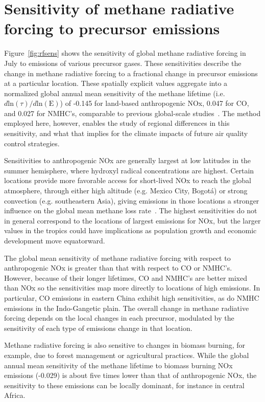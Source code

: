 \section{Sensitivity of methane radiative forcing to precursor emissions}

Figure~\ref{fig:rfsens} shows the sensitivity of global methane radiative forcing in July to emissions of various precursor gases. These sensitivities describe the change in methane radiative forcing to a fractional change in precursor emissions at a particular location. These spatially explicit values aggregate into a normalized global annual mean sensitivity of the methane lifetime (i.e. $d \mathrm{ln}(\tau)/d\mathrm{ln}(\mathrm{E})$) of -0.145 for land-based anthropogenic NOx, 0.047 for CO, and 0.027 for NMHC's, comparable to previous global-scale studies~\citep{ref:fry2012,ref:holmes2013}. The method employed here, however, enables the study of regional differences in this sensitivity, and what that implies for the climate impacts of future air quality control strategies.


Sensitivities to anthropogenic NOx are generally largest at low latitudes in the summer hemisphere, where hydroxyl radical concentrations are highest. Certain locations provide more favorable access for short-lived NOx to reach the global atmosphere, through either high altitude (e.g. Mexico City, Bogot\'a) or strong convection (e.g. southeastern Asia), giving emissions in those locations a stronger influence on the global mean methane loss rate~\citep{ref:bowman2012}. The highest sensitivities do not in general correspond to the locations of largest emissions for NOx, but the larger values in the tropics could have implications as population growth and economic development move equatorward.

The global mean sensitivity of methane radiative forcing with respect to anthropogenic NOx is greater than that with respect to CO or NMHC's. However, because of their longer lifetimes, CO and NMHC's are better mixed than NOx so the sensitivities map more directly to locations of high emissions. In particular, CO emissions in eastern China exhibit high sensitivities, as do NMHC emissions in the Indo-Gangetic plain. The overall change in methane radiative forcing depends on the local changes in each precursor, modulated by the sensitivity of each type of emissions change in that location.

Methane radiative forcing is also sensitive to changes in biomass burning, for example, due to forest management or agricultural practices. While the global annual mean sensitivity of the methane lifetime to biomass burning NOx emissions (-0.029) is about five times lower than that of anthropogenic NOx, the sensitivity to these emissions can be locally dominant, for instance in central Africa.

